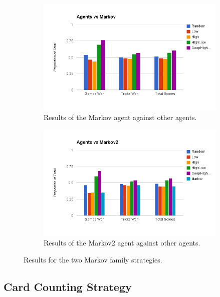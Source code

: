 \begin{figure}[ht]
    \begin{subfigure}[b]{0.5\textwidth}
        \centering
        \includegraphics[width=\textwidth]{data/markov.png}
        \caption{Results of the Markov agent against other agents.}
        \label{fig:results_markov}
    \end{subfigure}
    \begin{subfigure}[b]{0.5\textwidth}
        \centering
        \includegraphics[width=\textwidth]{data/markov2.png}
        \caption{Results of the Markov2 agent against other agents.}
        \label{fig:results_markov2}
    \end{subfigure}
    \caption{Results for the two Markov family strategies.}
\end{figure}


\subsection{Card Counting Strategy}

